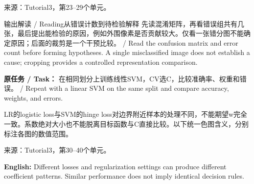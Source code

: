 来源：Tutorial3，第23–29个单元。








\begin{StudyBlock}{输出解读 / Reading}{从错误计数到待检验解释}
先读混淆矩阵，再看错误组共有几张，最后提出能检验的原因，例如外围像素是否贡献较大。仅看一张错分图不能确定原因；后面的裁剪是一个干预比较。 / Read the confusion matrix and error count before forming hypotheses. A single misclassified image does not establish a cause; cropping provides a controlled representation comparison.
\end{StudyBlock}







\textbf{原任务 / Task：} 在相同划分上训练线性SVM，CV选C，比较准确率、权重和错误。 / Repeat with a linear SVM on the same split and compare accuracy, weights, and errors.


LR的logistic loss与SVM的hinge loss对边界附近样本的处理不同，不能期望w完全一致。系数绝对大小也不能脱离目标函数与C直接比较。以下统一色图含义，分别标注各图的数值范围。


来源：Tutorial3，第30–40个单元。








\textbf{English:} Different losses and regularization settings can produce different coefficient patterns. Similar performance does not imply identical decision rules.







